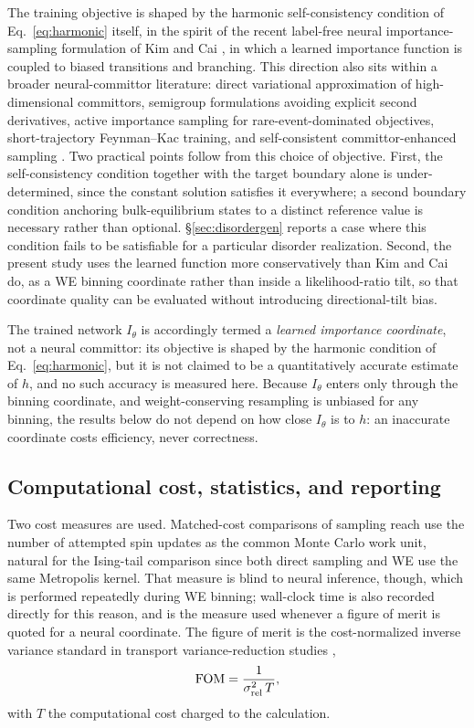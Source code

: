 \documentclass[a4paper,fleqn]{cas-sc}
\newcommand{\FOM}{\mathrm{FOM}}
\begin{document}
The training objective is shaped by the harmonic self-consistency condition of
Eq.~\eqref{eq:harmonic} itself, in the spirit of the recent label-free neural
importance-sampling formulation of Kim and Cai \citep{kimcai2026}, in which a learned
importance function is coupled to biased transitions and branching. This direction also sits
within a broader neural-committor literature: direct variational approximation of
high-dimensional committors, semigroup formulations avoiding explicit second derivatives,
active importance sampling for rare-event-dominated objectives, short-trajectory
Feynman--Kac training, and self-consistent committor-enhanced sampling
\citep{khoo2019,li2022,rotskoff2022,strahan2023,kang2024,trizio2025}. Two practical points
follow from this choice of objective. First, the self-consistency condition together with the
target boundary alone is under-determined, since the constant solution satisfies it
everywhere; a second boundary condition anchoring bulk-equilibrium states to a distinct
reference value is necessary rather than optional. \S\ref{sec:disordergen} reports a case
where this condition fails to be satisfiable for a particular disorder realization. Second,
the present study uses the learned function more conservatively than Kim and Cai do, as a WE
binning coordinate rather than inside a likelihood-ratio tilt, so that coordinate quality can
be evaluated without introducing directional-tilt bias.

The trained network $I_\theta$ is accordingly termed a \emph{learned importance coordinate},
not a neural committor: its objective is shaped by the harmonic condition of
Eq.~\eqref{eq:harmonic}, but it is not claimed to be a quantitatively accurate estimate of $h$,
and no such accuracy is measured here. Because $I_\theta$ enters only through the binning
coordinate, and weight-conserving resampling is unbiased for any binning, the results below do
not depend on how close $I_\theta$ is to $h$: an inaccurate coordinate costs efficiency, never
correctness.

\subsection{Computational cost, statistics, and reporting}\label{sec:cost}
Two cost measures are used. Matched-cost comparisons of sampling reach use the number of
attempted spin updates as the common Monte Carlo work unit, natural for the Ising-tail
comparison since both direct sampling and WE use the same Metropolis kernel. That measure is
blind to neural inference, though, which is performed repeatedly during WE binning; wall-clock
time is also recorded directly for this reason, and is the measure used whenever a figure of
merit is quoted for a neural coordinate. The figure of merit is the cost-normalized inverse
variance standard in transport variance-reduction studies \citep{spanier1969,wagnerfw2014},
\begin{equation}
\FOM=\frac{1}{\sigma_{\rm rel}^{2}\,T},
\label{eq:fom}
\end{equation}
with $T$ the computational cost charged to the calculation.
\end{document}

